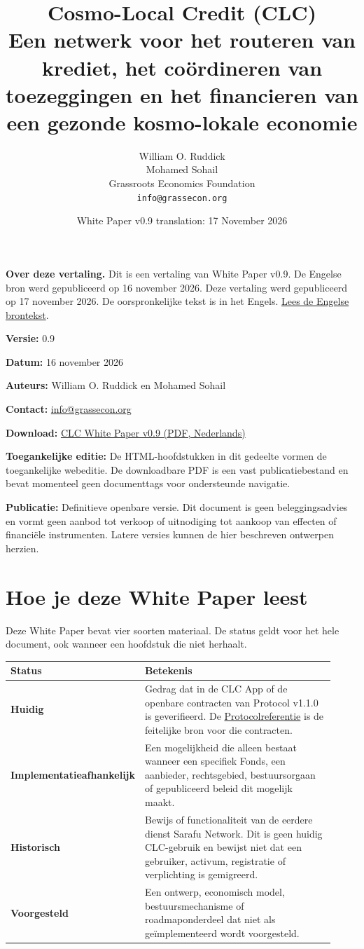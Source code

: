 \documentclass[11pt]{article}
\title{Cosmo-Local Credit (CLC)\\Een netwerk voor het routeren van krediet, het coördineren van toezeggingen en het financieren van een gezonde kosmo-lokale economie}
\author{William O. Ruddick \\ Mohamed Sohail \\ Grassroots Economics Foundation \\ \texttt{info@grassecon.org}}
\date{White Paper v0.9 translation: 17 November 2026}
\begin{document}
\maketitle
\tableofcontents
\newpage
\sloppy
\RaggedRight

\textbf{Over deze vertaling.} Dit is een vertaling van White Paper v0.9. De Engelse bron werd gepubliceerd op 16 november 2026. Deze vertaling werd gepubliceerd op 17 november 2026. De oorspronkelijke tekst is in het Engels. \href{https://docs.cosmolocal.credit/white-paper}{Lees de Engelse brontekst}.

\textbf{Versie:} 0.9

\textbf{Datum:} 16 november 2026

\textbf{Auteurs:} William O. Ruddick en Mohamed Sohail

\textbf{Contact:} \href{mailto:info@grassecon.org}{info@grassecon.org}

\textbf{Download:} \href{https://docs.cosmolocal.credit/white-paper/Cosmo-Local-Credit-CLC-White-Paper-v9-nl.pdf}{CLC White Paper v0.9 (PDF, Nederlands)}

\textbf{Toegankelijke editie:} De HTML-hoofdstukken in dit gedeelte vormen de toegankelijke webeditie. De downloadbare PDF is een vast publicatiebestand en bevat momenteel geen documenttags voor ondersteunde navigatie.

\textbf{Publicatie:} Definitieve openbare versie. Dit document is geen beleggingsadvies en vormt geen aanbod tot verkoop of uitnodiging tot aankoop van effecten of financiële instrumenten. Latere versies kunnen de hier beschreven ontwerpen herzien.

\section*{Hoe je deze White Paper leest}

Deze White Paper bevat vier soorten materiaal. De status geldt voor het hele document, ook wanneer een hoofdstuk die niet herhaalt.

\begin{longtable}{P{0.30\linewidth} P{0.62\linewidth}}
\toprule
Status & Betekenis \\
\midrule
\endhead
\textbf{Huidig} & Gedrag dat in de CLC App of de openbare contracten van Protocol v1.1.0 is geverifieerd. De \href{https://docs.cosmolocal.credit/nl/protocol/overview}{Protocolreferentie} is de feitelijke bron voor die contracten. \\
\textbf{Implementatieafhankelijk} & Een mogelijkheid die alleen bestaat wanneer een specifiek Fonds, een aanbieder, rechtsgebied, bestuursorgaan of gepubliceerd beleid dit mogelijk maakt. \\
\textbf{Historisch} & Bewijs of functionaliteit van de eerdere dienst Sarafu Network. Dit is geen huidig CLC-gebruik en bewijst niet dat een gebruiker, activum, registratie of verplichting is gemigreerd. \\
\textbf{Voorgesteld} & Een ontwerp, economisch model, bestuursmechanisme of roadmaponderdeel dat niet als geïmplementeerd wordt voorgesteld. \\
\bottomrule
\end{longtable}
\end{document}
